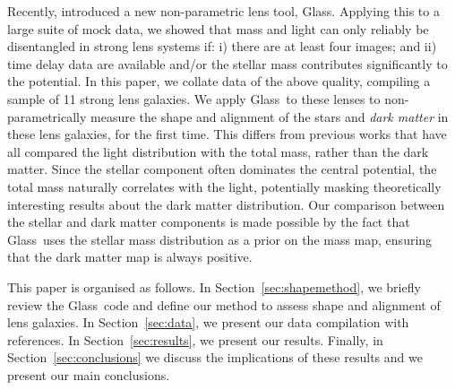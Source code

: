 \documentclass[useAMS,usenatbib]{mn2e}
\def\Glass{{\sc Glass}}
\begin{document}

Recently, \citet{2014MNRAS.445.2181C} introduced a new non-parametric lens tool, \Glass. Applying this to a large suite of mock data, we showed that mass and light can only reliably be disentangled in strong lens systems if: i) there are at least four images; and ii) time delay data are available and/or the stellar mass contributes significantly to the potential. In this paper, we collate data of the above quality, compiling a sample of 11 strong lens galaxies. We apply \Glass\ to these lenses to non-parametrically measure the shape and alignment of the stars and {\it dark matter} in these lens galaxies, for the first time. This differs from previous works that have all compared the light distribution with the total mass, rather than the dark matter. Since the stellar component often dominates the central potential, the total mass naturally correlates with the light, potentially masking theoretically interesting results about the dark matter distribution. Our comparison between the stellar and dark matter components is made possible by the fact that \Glass\ uses the stellar mass distribution as a prior on the mass map, ensuring that the dark matter map is always positive.

This paper is organised as follows. In Section~\ref{sec:shapemethod}, we briefly review the \Glass\ code and define our method to assess shape and alignment of lens galaxies. In Section~\ref{sec:data}, we present our data compilation with references. In Section~\ref{sec:results}, we present our results. Finally, in Section~\ref{sec:conclusions} we discuss the implications of these results and we present our main conclusions.
\end{document}
